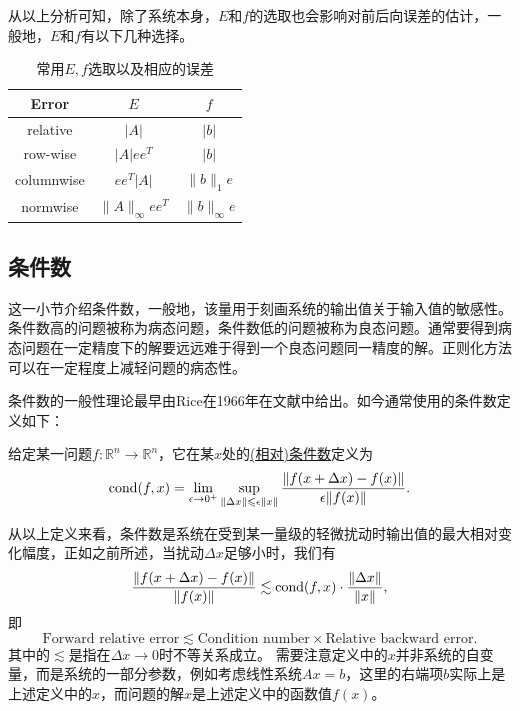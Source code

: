 \documentclass[a4paper,10pt]{ctexart}
\begin{document}
从以上分析可知，除了系统本身，$ E $和$ f $的选取也会影响对前后向误差的估计，一般地，$ E $和$ f $有以下几种选择。
\begin{table}[h]
    \centering
    \begin{tabular}{ccc}
        \toprule
        Error & $ E $ & $ f $ \\
        \midrule
        relative & $ |A| $ & $ |b| $ \\
        row-wise & $ |A|ee^T $ & $ |b| $ \\
        columnwise & $ ee^T|A| $ & $ \| b \|_1 e $ \\
        normwise & $ \| A \|_\infty ee^T $ & $ \| b \|_\infty e $ \\
        \bottomrule
    \end{tabular}
    \caption{常用$ E,f $选取以及相应的误差}
    \label{tab:example}
\end{table}

\subsection{条件数}
这一小节介绍条件数，一般地，该量用于刻画系统的输出值关于输入值的敏感性。条件数高的问题被称为病态问题，条件数低的问题被称为良态问题。通常要得到病态问题在一定精度下的解要远远难于得到一个良态问题同一精度的解。正则化方法可以在一定程度上减轻问题的病态性。

条件数的一般性理论最早由Rice在1966年在文献\cite{rice1966theory}中给出。如今通常使用的条件数定义如下：
\begin{definition}
    给定某一问题$ f: \mathbb{R}^n \to \mathbb{R}^n$，它在某$ x $处的\href{https://nhigham.com/2020/03/19/what-is-a-condition-number/}{(相对)条件数}定义为
    \begin{equation}
        {\rm cond}(f,x) = \lim_{\epsilon\to 0^+} \sup_{\| \Delta x \|\leqslant \epsilon \| x \| }\frac{\| f(x+\Delta x) - f(x)\| }{\epsilon \| f(x) \| }.
    \end{equation}
\end{definition}
从以上定义来看，条件数是系统在受到某一量级的轻微扰动时输出值的最大相对变化幅度，正如之前所述，当扰动$ \Delta x $足够小时，我们有
\begin{equation}
    \frac{\| f(x+\Delta x) - f(x)\| }{\| f(x) \| }\lesssim {\rm cond}(f,x)\cdot \frac{\| \Delta x \|}{\| x \| },
\end{equation}
即
\begin{equation}
    \text{Forward relative error} \lesssim \text{Condition number} \times \text{Relative backward error}.
\end{equation}
其中的$ \lesssim $是指在$ \Delta x\to 0 $时不等关系成立。
需要注意定义中的$ x $并非系统的自变量，而是系统的一部分参数，例如考虑线性系统$ Ax=b $，这里的右端项$ b $实际上是上述定义中的$ x $，而问题的解$ x $是上述定义中的函数值$ f(x) $。
\end{document}
